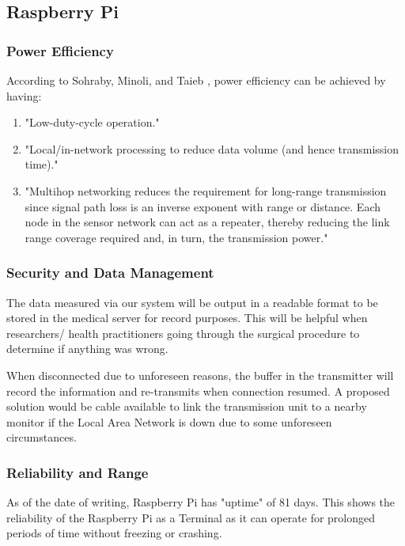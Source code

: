 \subsection{Raspberry Pi}

\subsubsection{Power Efficiency}

According to Sohraby, Minoli, and Taieb \cite{sohraby2007wireless}, power efficiency can be achieved by having: 

\begin{enumerate}
	\item "Low-duty-cycle operation."
	\item "Local/in-network processing to reduce data volume (and hence transmission time)."
	\item "Multihop networking reduces the requirement for long-range transmission since signal path loss is an inverse exponent with range or distance. Each node in the sensor network can act as a repeater, thereby reducing the link range coverage required and, in turn, the transmission power." 
\end{enumerate}

\subsubsection{Security and Data Management}
The data measured via our system will be output in a readable format to be stored in the medical server for record purposes. This will be helpful when researchers/ health practitioners going through the surgical procedure to determine if anything was wrong. 

When disconnected due to unforeseen reasons, the buffer in the transmitter will record the information and re-transmits when connection resumed. A proposed solution would be cable available to link the transmission unit to a nearby monitor if the Local Area Network is down due to some unforeseen circumstances. 

\subsubsection{Reliability and Range}
As of the date of writing, Raspberry Pi has "uptime" of 81 days. This shows the reliability of the Raspberry Pi as a Terminal as it can operate for prolonged periods of time without freezing or crashing. 

